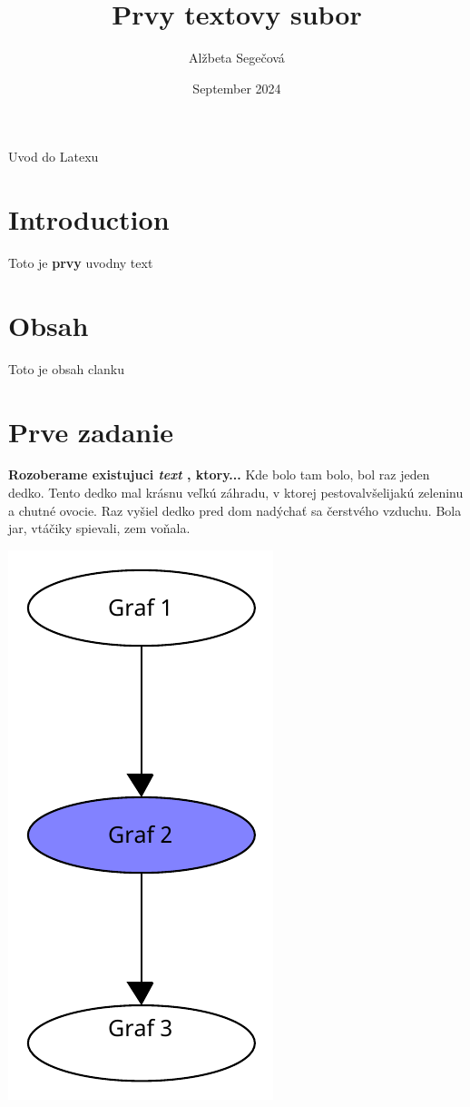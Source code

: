 \documentclass[10pt,twocolumn,twoside,slovak,a4paper]{article}
\title{Prvy textovy subor}
\author{Alžbeta Segečová}
\date{September 2024}
\begin{document}
\maketitle
Uvod do Latexu


\section{Introduction}
Toto je \textbf{prvy} uvodny text 

\section{Obsah}
Toto je obsah clanku


\section{Prve zadanie}
\textbf{Rozoberame existujuci \emph{text} , ktory... }
Kde bolo tam bolo, bol raz jeden dedko. Tento dedko mal krásnu veľkú záhradu, v ktorej pestovalvšelijakú zeleninu a chutné ovocie. Raz vyšiel dedko pred dom nadýchať sa čerstvého vzduchu. Bola jar, vtáčiky spievali, zem voňala.

\includegraphics[width =10 cm]{diagram.pdf}
\end{document}
